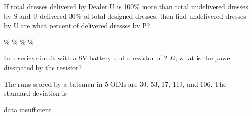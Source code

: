\documentclass{exam}
\begin{document}
\begin{multicols}{2}
\begin{questions}
\question   If total dresses delivered by Dealer U is 100\% more than total undelivered dresses by S and U delivered 30\% of total designed dresses, then find undelivered dresses by U are what percent of delivered dresses by P?

\begin{randomizechoices}
\% 
\%  
\% 
\% 
\end{randomizechoices}\question   In a series circuit with a 8V battery and a resistor of 2 $\Omega$, what is the power dissipated by the resistor?

\begin{randomizechoices}
\end{randomizechoices}

\question The runs scored by a batsman in 5 ODIs are 30, 53, 17, 119, and 106. The standard deviation is


\begin{randomizechoices}
\choice data insufficient 
\end{randomizechoices}


\end{questions}
\end{multicols}
\printkeytable	  
\end{document}
